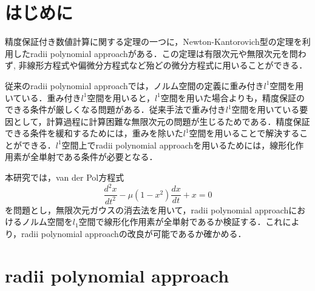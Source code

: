 \documentclass[a4paper,10pt,twocolumn]{jsarticle}
\title{\vspace{-8mm}{\Large \gtfamily\mdseries\upshape 無限次元ガウスの消去法を用いた \rad{}改良 }\vspace{-3mm}}
\date{}
\author{（指導教員 関根 晃太 准教授） \\ 関根研究室 2131701 齋藤 悠希
\vspace{-5mm}}
\newcommand{\rad}{radii polynomial approach}
\newcommand{\nk}{Newton-Kantorovich}
\newcommand{\vdp}{van der Pol方程式}
\begin{document}
\maketitle
\vspace{-10mm}



\section{はじめに}
\vspace{-1mm}
精度保証付き数値計算に関する定理の一つに，\nk{}型の定理を利用した\rad{}がある．この定理は有限次元や無限次元を問わず, 非線形方程式や偏微分方程式など殆どの微分方程式に用いることができる．

従来の\rad{}では，ノルム空間の定義に重み付き$l^1$空間を用いている．重み付き$l^1$空間を用いると，$l^1$空間を用いた場合よりも，精度保証のできる条件が厳しくなる問題がある．従来手法で重み付き$l^1$空間を用いている要因として，計算過程に計算困難な無限次元の問題が生じるためである．精度保証できる条件を緩和するためには，重みを除いた$l^1$空間を用いることで解決することができる．$l^1$空間上で\rad{}を用いるためには，線形化作用素が全単射である条件が必要となる．

本研究では，\vdp{}
\begin{equation}
  \frac{d^2x}{dt^2} - \mu (1-x^2)\frac{dx}{dt}+x=0
\end{equation}
を問題とし，無限次元ガウスの消去法\cite{r1}を用いて，\rad{}におけるノルム空間を$l_1$空間で線形化作用素が全単射であるか検証する．これにより，\rad{}の改良が可能であるか確かめる．



\vspace{-1mm}
\section{\rad{} \cite{github}}
\vspace{-1mm}
\end{document}
